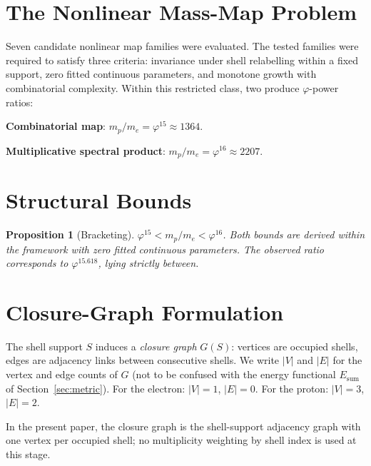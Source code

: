 \documentclass[12pt]{article}
\newtheorem{proposition}[theorem]{Proposition}
\newcommand{\phig}{\varphi}
\begin{document}
\section{The Nonlinear Mass-Map Problem}\label{sec:nonlinear}

Seven candidate nonlinear map families were evaluated. The tested families were required to satisfy three criteria: invariance under shell relabelling within a fixed support, zero fitted continuous parameters, and monotone growth with combinatorial complexity. Within this restricted class, two produce $\phig$-power ratios:

\textbf{Combinatorial map}: $m_p/m_e = \phig^{15} \approx 1364$.

\textbf{Multiplicative spectral product}: $m_p/m_e = \phig^{16} \approx 2207$.

\section{Structural Bounds}\label{sec:bracketing}

\begin{proposition}[Bracketing]\label{prop:bracket}
$\phig^{15} < m_p/m_e < \phig^{16}$. Both bounds are derived within the framework with zero fitted continuous parameters. The observed ratio corresponds to $\phig^{15.618}$, lying strictly between.
\end{proposition}

\section{Closure-Graph Formulation}\label{sec:graph}

The shell support $S$ induces a \textit{closure graph} $G(S)$: vertices are occupied shells, edges are adjacency links between consecutive shells. We write $|V|$ and $|E|$ for the vertex and edge counts of $G$ (not to be confused with the energy functional $E_{\mathrm{sum}}$ of Section~\ref{sec:metric}). For the electron: $|V| = 1$, $|E| = 0$. For the proton: $|V| = 3$, $|E| = 2$.

In the present paper, the closure graph is the shell-support adjacency graph with one vertex per occupied shell; no multiplicity weighting by shell index is used at this stage.
\end{document}
